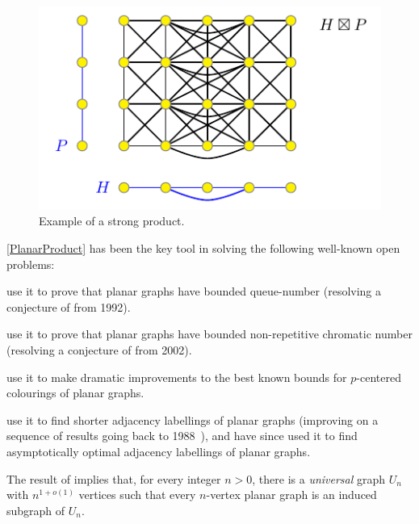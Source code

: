 \documentclass{patmorin}
\begin{document}
\begin{figure}[!h]
\centering%
	\includegraphics{ProductExample}
	\caption{Example of a strong product.
	\label{ProductExample}}
\end{figure}

\noindent\cref{PlanarProduct} has been the key tool in solving the following well-known open problems:
\begin{compactitem}
\item \citet{dujmovic.joret.ea:planar} use it to prove that planar graphs have bounded queue-number (resolving a conjecture of \citet{HLR92} from 1992).
\item  \citet{dujmovic.esperet.ea:planar} use it to prove that planar graphs have bounded non-repetitive chromatic number (resolving a conjecture of \citet{AGHR-RSA02} from 2002).
\item \citet{debski.felsner.ea:improved} use it to make dramatic improvements to the best known bounds for $p$-centered colourings of planar graphs. 
\item \citet{bonamy.gavoille.ea:shorter} use it to find shorter adjacency labellings of planar graphs (improving on a sequence of results going back to 1988~\citep{kannan.naor.ea:implicit-stoc,kannan.naor.ea:implicit}), and \citet{DEJGMM} have since used it to find asymptotically optimal
adjacency labellings of planar graphs.
\item The result of \citet{DEJGMM} implies that, for every integer
$n>0$, there is a \emph{universal} graph $U_n$ with $n^{1+o(1)}$ 
vertices such that every $n$-vertex planar graph is an induced
subgraph of $U_n$.
\end{compactitem} 
\end{document}
